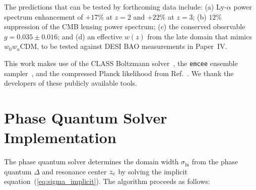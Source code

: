 \documentclass[aps,prd,twocolumn,superscriptaddress,nofootinbib]{revtex4-2}
\newcommand{\zc}{z_{\rm c}}
\newcommand{\sln}{\sigma_{\ln}}
\begin{document}
The predictions that can be tested by forthcoming data include: (a)
Ly-$\alpha$ power spectrum enhancement of $+17\%$ at $z = 2$ and
$+22\%$ at $z = 3$; (b) $12\%$ suppression of the CMB lensing power
spectrum; (c) the conserved observable $g = 0.035 \pm 0.016$; and (d)
an effective $w(z)$ from the late domain that mimics $w_0 w_a$CDM, to
be tested against DESI BAO measurements in Paper~IV.

\begin{acknowledgments}
This work makes use of the CLASS Boltzmann
solver~\cite{Blas2011}, the \texttt{emcee} ensemble
sampler~\cite{ForemanMackey2013}, and the compressed Planck likelihood
from Ref.~\cite{Planck2018}. We thank the developers of these
publicly available tools.
\end{acknowledgments}

\appendix

\section{Phase Quantum Solver Implementation}
\label{app:solver}

The phase quantum solver determines the domain width $\sln$ from the
phase quantum $\Delta$ and resonance center $\zc$ by solving the
implicit equation~(\ref{eq:sigma_implicit}). The algorithm proceeds
as follows:
\end{document}
